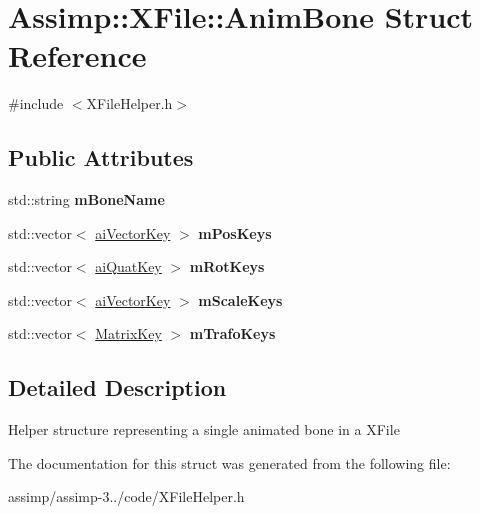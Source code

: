 \hypertarget{struct_assimp_1_1_x_file_1_1_anim_bone}{\section{Assimp\+:\+:X\+File\+:\+:Anim\+Bone Struct Reference}
\label{struct_assimp_1_1_x_file_1_1_anim_bone}
}


{\ttfamily \#include $<$X\+File\+Helper.\+h$>$}

\subsection*{Public Attributes}
\begin{DoxyCompactItemize}
\item 
\hypertarget{struct_assimp_1_1_x_file_1_1_anim_bone_a802af1884e4ca54b788cf6c13e91409b}{std\+::string {\bfseries m\+Bone\+Name}}\label{struct_assimp_1_1_x_file_1_1_anim_bone_a802af1884e4ca54b788cf6c13e91409b}

\item 
\hypertarget{struct_assimp_1_1_x_file_1_1_anim_bone_a14cd1beda96e4ff342f5dfd8418452c8}{std\+::vector$<$ \hyperlink{structai_vector_key}{ai\+Vector\+Key} $>$ {\bfseries m\+Pos\+Keys}}\label{struct_assimp_1_1_x_file_1_1_anim_bone_a14cd1beda96e4ff342f5dfd8418452c8}

\item 
\hypertarget{struct_assimp_1_1_x_file_1_1_anim_bone_a628b04523679f0a129247fa28b90c705}{std\+::vector$<$ \hyperlink{structai_quat_key}{ai\+Quat\+Key} $>$ {\bfseries m\+Rot\+Keys}}\label{struct_assimp_1_1_x_file_1_1_anim_bone_a628b04523679f0a129247fa28b90c705}

\item 
\hypertarget{struct_assimp_1_1_x_file_1_1_anim_bone_afbc91db08441131af97cc0aa37909daf}{std\+::vector$<$ \hyperlink{structai_vector_key}{ai\+Vector\+Key} $>$ {\bfseries m\+Scale\+Keys}}\label{struct_assimp_1_1_x_file_1_1_anim_bone_afbc91db08441131af97cc0aa37909daf}

\item 
\hypertarget{struct_assimp_1_1_x_file_1_1_anim_bone_a90aaca647df954e1840e2ecec81e45bb}{std\+::vector$<$ \hyperlink{struct_assimp_1_1_x_file_1_1_matrix_key}{Matrix\+Key} $>$ {\bfseries m\+Trafo\+Keys}}\label{struct_assimp_1_1_x_file_1_1_anim_bone_a90aaca647df954e1840e2ecec81e45bb}

\end{DoxyCompactItemize}


\subsection{Detailed Description}
Helper structure representing a single animated bone in a X\+File 

The documentation for this struct was generated from the following file\+:\begin{DoxyCompactItemize}
\item 
assimp/assimp-\/3../code/X\+File\+Helper.\+h\end{DoxyCompactItemize}
